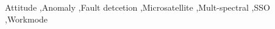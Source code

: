 \documentclass[final,5p,times,twocolumn]{elsarticle}
\begin{document}
\begin{frontmatter}

\begin{keyword}
	Attitude \sep Anomaly \sep Fault detcetion \sep Microsatellite \sep Mult-spectral \sep SSO \sep Workmode

\end{keyword}
\end{frontmatter}


\end{document}
